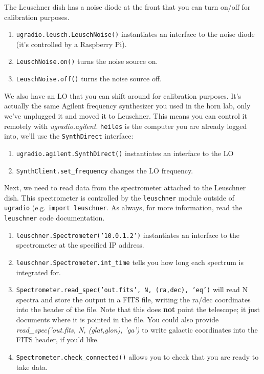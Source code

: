 \documentclass[psfig,preprint]{aastex}
\begin{document}
The Leuschner dish has a noise diode at the front that you can turn on/off for
calibration purposes.
\begin{enumerate}
\item {\tt ugradio.leusch.LeuschNoise()} instantiates an interface to the noise diode (it's controlled
by a Raspberry Pi).
\item {\tt LeuschNoise.on()} turns the noise source on.
\item {\tt LeuschNoise.off()} turns the noise source off.
\end{enumerate}

We also have an LO that you can shift around for calibration purposes.  It's actually the same
Agilent frequency synthesizer you used in the horn lab, only we've unplugged it and moved it to Leuschner.  This
means you can control it remotely with {\it ugradio.agilent}. 
 {\tt heiles} is the computer you are
already logged into, we'll use the {\tt SynthDirect} interface:
\begin{enumerate}
\item {\tt ugradio.agilent.SynthDirect()} instantiates an interface to the LO
\item {\tt SynthClient.set\_frequency} changes the LO frequency.
\end{enumerate}

Next, we need to read data from the spectrometer attached to the Leuschner dish.  This
spectrometer is controlled by the {\tt leuschner} module outside of {\tt ugradio} (e.g.
{\tt import leuschner}.  As always, for more information, read the {\tt leuschner} code documentation.
\begin{enumerate}
\item {\tt leuschner.Spectrometer('10.0.1.2')} instantiates an interface to the spectrometer
at the specified IP address.
\item {\tt leuschner.Spectrometer.int\_time} tells you how long each spectrum is integrated for.
\item {\tt Spectrometer.read\_spec('out.fits', N, (ra,dec), 'eq')} will read N spectra and
store the output in a FITS file, writing the ra/dec coordinates into the header of the file.  Note that
this does {\bf not} point the telescope; it just documents where it is pointed in the file.  You
could also provide {\it read\_spec('out.fits, N, (glat,glon), 'ga')} to write galactic coordinates
into the FITS header, if you'd like.
\item {\tt Spectrometer.check\_connected()} allows you to check that you are ready to take data.
\end{enumerate}
\end{document}
